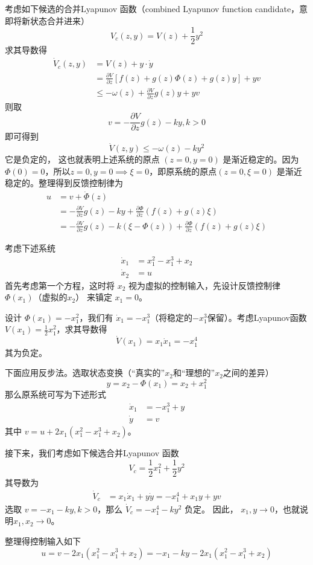 考虑如下候选的合并Lyapunov 函数（combined Lyapunov function candidate，意即将新状态合并进来）
\[ V_c (z, y) = V (z) + \frac{1}{2} y^2 \]
求其导数得
\begin{align*}
  \dot{V}_c (z, y) & = V (z) + y \cdot \dot{y}\\
  & = \frac{\partial V}{\partial z} [f (z) + g (z) \Phi (z) + g (z) y] + y 
  v\\
  & \leq - \omega (z) + \frac{\partial V}{\partial z} g (z) y + y  v
\end{align*}
则取 \[v = - \frac{\partial V}{\partial z} g (z) - k  y, k > 0\]
即可得到\[\dot{V} (z, y) \leq - \omega (z) - k  y^2\]
它是负定的，
这也就表明上述系统的原点 $(z = 0, y = 0)$ 是渐近稳定的。因为
$\Phi (0) = 0$，所以$z = 0, y = 0\implies \xi =0$，即原系统的原点$(z = 0, \xi = 0)$ 是渐近稳定的。整理得到反馈控制律为
\begin{align*}
  u & = v + \dot{\Phi}(z)\\
  & = - \frac{\partial V}{\partial z} g (z) - k  y + \frac{\partial
  \Phi}{\partial z} (f (z) + g (z) \xi)\\
  & = - \frac{\partial V}{\partial z} g (z) - k  (\xi - \Phi (z)) +
  \frac{\partial \Phi}{\partial z} (f (z) + g (z) \xi)
\end{align*}
\begin{example}[利用反步法进行非线性系统设计]
  考虑下述系统
  \begin{align*}
    \dot{x}_1 & = x^2_1 - x^3_1 + x_2\\
    \dot{x}_2 & = u
  \end{align*}
 首先考虑第一个方程，这时将 $x_2$ 视为虚拟的控制输入，先设计反馈控制律 $\Phi (x_1)$（虚拟的$x_2$） 来镇定 $x_1 = 0$。
  
  设计 $\Phi (x_1) = - x^2_1$，我们有 $\dot{x}_1 = - x^3_1$（将稳定的$- x^3_1$保留）。考虑Lyapunov函数
  $V (x_1) = \frac{1}{2} x^2_1$，求其导数得
  \[ \dot{V} (x_1) = x_1 \dot{x}_1 = - x^4_1 \]
  其为负定。
  
  下面应用反步法。选取状态变换（“真实的”$x_2$和“理想的”$x_2$之间的差异）
  \[ y = x_2 - \Phi (x_1) = x_2 + x^2_1 \]
  那么原系统可写为下述形式
  \begin{align*}
    \dot{x}_1 & = - x^3_1 + y\\
    \dot{y}  & = v
  \end{align*}
  其中 $v = u + 2 x_1 (x^2_1 - x^3_1 + x_2)$。
  
  接下来，我们考虑如下候选合并Lyapunov 函数
  \[ V_c = \frac{1}{2} x^2_1 + \frac{1}{2} y^2 \]
  其导数为
  \begin{align*}
    \dot{V}_c & = x_1 \dot{x}_1 + y  \dot{y} = - x^4_1 + x_1 y + y  v
  \end{align*}
  选取 $v = - x_1 - k  y, k > 0$，那么 $\dot{V}_c = - x^4_1 - k  y^2$ 负定。
  因此， $x_1, y \rightarrow 0$，也就说明$x_1,x_2\rightarrow 0$。
  
  整理得控制输入如下
  \[ u = v - 2 x_1 (x^2_1 - x^3_1 + x_2) = - x_1 - k  y - 2 x_1 (x^2_1 - x^3_1
     + x_2) \]
\end{example}

